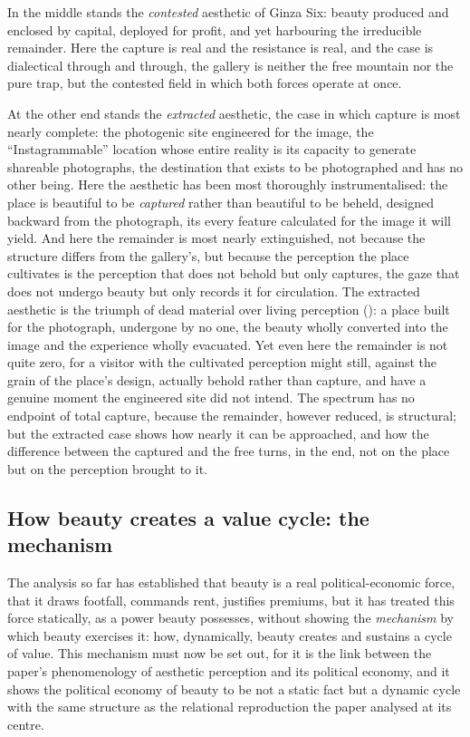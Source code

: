 In the middle stands the \emph{contested} aesthetic of Ginza Six: beauty produced and enclosed by capital, deployed for profit, and yet harbouring the irreducible remainder. Here the capture is real and the resistance is real, and the case is dialectical through and through, the gallery is neither the free mountain nor the pure trap, but the contested field in which both forces operate at once.

At the other end stands the \emph{extracted} aesthetic, the case in which capture is most nearly complete: the photogenic site engineered for the image, the ``Instagrammable'' location whose entire reality is its capacity to generate shareable photographs, the destination that exists to be photographed and has no other being. Here the aesthetic has been most thoroughly instrumentalised: the place is beautiful to be \emph{captured} rather than beautiful to be beheld, designed backward from the photograph, its every feature calculated for the image it will yield. And here the remainder is most nearly extinguished, not because the structure differs from the gallery's, but because the perception the place cultivates is the perception that does not behold but only captures, the gaze that does not undergo beauty but only records it for circulation. The extracted aesthetic is the triumph of dead material over living perception (): a place built for the photograph, undergone by no one, the beauty wholly converted into the image and the experience wholly evacuated. Yet even here the remainder is not quite zero, for a visitor with the cultivated perception might still, against the grain of the place's design, actually behold rather than capture, and have a genuine moment the engineered site did not intend. The spectrum has no endpoint of total capture, because the remainder, however reduced, is structural; but the extracted case shows how nearly it can be approached, and how the difference between the captured and the free turns, in the end, not on the place but on the perception brought to it.

\subsection{How beauty creates a value cycle: the mechanism}
\label{p21:sub:pe-cycle}

The analysis so far has established that beauty is a real political-economic force, that it draws footfall, commands rent, justifies premiums, but it has treated this force statically, as a power beauty possesses, without showing the \emph{mechanism} by which beauty exercises it: how, dynamically, beauty creates and sustains a cycle of value. This mechanism must now be set out, for it is the link between the paper's phenomenology of aesthetic perception and its political economy, and it shows the political economy of beauty to be not a static fact but a dynamic cycle with the same structure as the relational reproduction the paper analysed at its centre.

